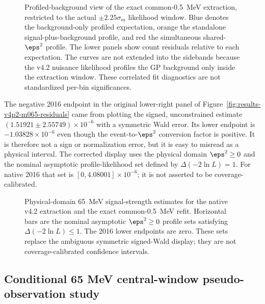 \begin{figure}[H]
\centering
{}
\caption{Profiled-background view of the exact common-0.5~MeV extraction,
restricted to the actual $\pm2.25\sigma_m$ likelihood window.  Blue denotes
the background-only profiled expectation, orange the standalone
signal-plus-background profile, and red the simultaneous shared-$\eps^2$
profile.  The lower panels show count residuals relative to each expectation.
The curves are not extended into the sidebands because the v4.2 nuisance
likelihood profiles the GP background only inside the extraction window.
These correlated fit diagnostics are not standardized per-bin significances.}
\label{fig:appendix-v4p2-common-binning-profiled}
\end{figure}

The negative 2016 endpoint in the original lower-right panel of
Figure~\ref{fig:results-v4p2-m065-residuals} came from plotting the signed,
unconstrained estimate
$(1.51921\pm2.55749)\times10^{-6}$ with a symmetric Wald error.  Its lower
endpoint is $-1.03828\times10^{-6}$ even though the event-to-$\eps^2$
conversion factor is positive.  It is therefore not a sign or normalization
error, but it is easy to misread as a physical interval.  The corrected
display uses the physical domain $\eps^2\geq0$ and the nominal asymptotic
profile-likelihood set defined by $\Delta(-2\ln L)=1$.  For native 2016 that
set is $[0,4.08001]\times10^{-6}$; it is not asserted to be
coverage-calibrated.

\begin{figure}[H]
\centering
{}
\caption{Physical-domain 65~MeV signal-strength estimates for the native v4.2
extraction and the exact common-0.5~MeV refit.  Horizontal bars are the nominal
asymptotic $\eps^2\geq0$ profile sets satisfying
$\Delta(-2\ln L)\leq1$.  The 2016 lower endpoints are zero.  These sets replace
the ambiguous symmetric signed-Wald display; they are not
coverage-calibrated confidence intervals.}
\label{fig:appendix-v4p2-physical-profile-intervals}
\end{figure}

\subsection{Conditional 65 MeV central-window pseudo-observation study}
\label{app:v4p2-pseudo65}

